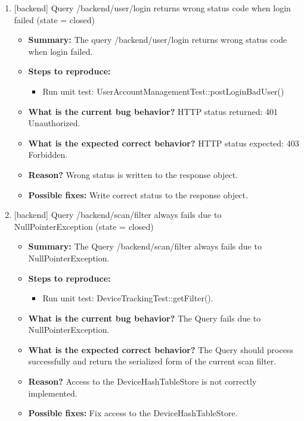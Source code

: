 \begin{enumerate}
\item  {[backend] Query /backend/user/login returns wrong status code when login failed (state = closed)}
\begin{itemize}	
	\item \textbf{Summary: }The query /backend/user/login returns wrong status code when login failed.\\
	\item \textbf{Steps to reproduce: }
	\begin{itemize}
		\item Run unit test: UserAccountManagementTest::postLoginBadUser()
	\end{itemize}
	\item \textbf{What is the current bug behavior? }HTTP status returned: 401 Unauthorized.\\
	\item \textbf{What is the expected correct behavior? }HTTP status expected: 403 Forbidden.\\
	\item \textbf{Reason? }Wrong status is written to the response object.\\
	\item \textbf{Possible fixes: }Write correct status to the response object.\\
\end{itemize}


\item {[backend] Query /backend/scan/filter always fails due to NullPointerException (state = closed)}
\begin{itemize}	
	\item \textbf{Summary: }The Query /backend/scan/filter always fails due to NullPointerException.\\
	\item \textbf{Steps to reproduce: }
	\begin{itemize}
		\item Run unit test: DeviceTrackingTest::getFilter().\\
	\end{itemize}
	\item \textbf{What is the current bug behavior? }The Query fails due to NullPointerException.\\
	\item \textbf{What is the expected correct behavior? }The Query should process successfully and return the serialized form of the current scan filter.\\
	\item \textbf{Reason? } Access to the DeviceHashTableStore is not correctly implemented.\\
	\item \textbf{Possible fixes: } Fix access to the DeviceHashTableStore.\\
\end{itemize}


\end{enumerate}
